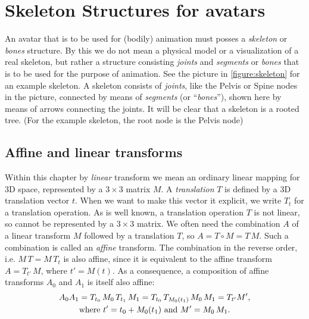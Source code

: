 \section{Skeleton Structures for avatars}
An avatar that is to be used for (bodily) animation must
posses a \emph{skeleton} or \emph{bones} structure.
By this we do not mean a physical model or a visualization of
a real skeleton, but rather a structure consisting \emph{joints} and
\emph{segments} or \emph{bones} that is to be used for the purpose of animation.
See the picture in \autoref{figure:skeleton} for an example skeleton.
A skeleton consists of \emph{joints}, like the Pelvis or Spine nodes in the picture,
connected by means of \emph{segments} (or ``\emph{bones}''), shown here by means
of arrows connecting the joints. It will be clear that a skeleton is a rooted tree.
(For the example skeleton, the root node is the Pelvis node)





\def\Alocal{\mathstrut^L\!A}




\subsection{Affine and linear transforms}
Within this chapter by \emph{linear} transform we mean an ordinary linear mapping for 3D space, represented
by a $3\times 3$ matrix $M$.
A \emph{translation} $T$ is defined by a 3D translation vector $t$.
When we want to make this vector it explicit, we write $T_t$ for a translation operation.
As is well known, a translation operation $T$ is not linear, so cannot be represented by a $3\times 3$ matrix.
We often need the combination $A$ of a linear transform $M$ followed by a translation $T$, so $A=T\circ M = T\,M$.
Such a combination is called an \emph{affine} transform.
The combination in the reverse order, i.e. $M\,T = M\, T_t$ is also affine, since it is equivalent
to the affine transform $A = T_{t'} \, M$, where $t'=M(t)$.
As a consequence, a composition of affine transforms $A_0$ and $A_1$ is itself also affine:
%
\begin{gather}\label{affinecomposition}
A_0A_1 = T_{t_0}\,M_0\, T_{t_1}\, M_1 = T_{t_0}\,T_{M_0(t_1)}\,  M_0 \,M_1 =
T_{t'}M',\\
\text{where } t' = t_0 + M_0(t_1) \text{ and } M' = M_0\, M_1.\notag
\end{gather}
%

